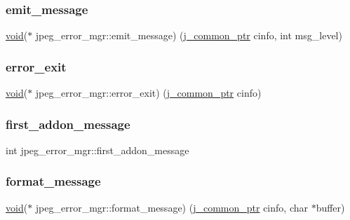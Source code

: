 \subsubsection{\texorpdfstring{emit\+\_\+message}{emit\_message}}
{\footnotesize\ttfamily \hyperlink{png_8h_ac9c84fa68bbad002983e35ce3663c686}{void}($\ast$ jpeg\+\_\+error\+\_\+mgr\+::emit\+\_\+message) (\hyperlink{jpeglib_8h_a1a177ab705cefea8f30ec31a48e62650}{j\+\_\+common\+\_\+ptr} cinfo, int msg\+\_\+level)}

\mbox{\label{structjpeg__error__mgr_aebcba526d672e824d5545b3eb07f881c}} 
\subsubsection{\texorpdfstring{error\+\_\+exit}{error\_exit}}
{\footnotesize\ttfamily \hyperlink{png_8h_ac9c84fa68bbad002983e35ce3663c686}{void}($\ast$ jpeg\+\_\+error\+\_\+mgr\+::error\+\_\+exit) (\hyperlink{jpeglib_8h_a1a177ab705cefea8f30ec31a48e62650}{j\+\_\+common\+\_\+ptr} cinfo)}

\mbox{\label{structjpeg__error__mgr_a35a1536b1171bb13510b5156ffa0af05}} 
\subsubsection{\texorpdfstring{first\+\_\+addon\+\_\+message}{first\_addon\_message}}
{\footnotesize\ttfamily int jpeg\+\_\+error\+\_\+mgr\+::first\+\_\+addon\+\_\+message}

\mbox{\label{structjpeg__error__mgr_a5a42a63579855f682ff619a88ecdc705}} 
\subsubsection{\texorpdfstring{format\+\_\+message}{format\_message}}
{\footnotesize\ttfamily \hyperlink{png_8h_ac9c84fa68bbad002983e35ce3663c686}{void}($\ast$ jpeg\+\_\+error\+\_\+mgr\+::format\+\_\+message) (\hyperlink{jpeglib_8h_a1a177ab705cefea8f30ec31a48e62650}{j\+\_\+common\+\_\+ptr} cinfo, char $\ast$buffer)}

